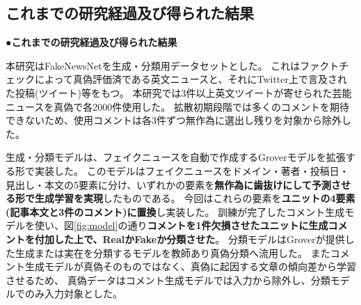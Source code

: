 {	%


	\subsection{これまでの研究経過及び得られた結果}
	\noindent
	●\textbf{これまでの研究経過及び得られた結果}

	本研究はFakeNewsNet\cite{Shu2018FakeNewsNetAD, shu2017fake}を生成・分類用データセットとした。
	これはファクトチェックによって真偽評価済である英文ニュースと、それにTwitter上で言及された投稿(ツイート)等をもつ。
	本研究では3件以上英文ツイートが寄せられた芸能ニュースを真偽で各2000件使用した。
	拡散初期段階では多くのコメントを期待できないため、使用コメントは各3件ずつ無作為に選出し残りを対象から除外した。

	生成・分類モデルは、フェイクニュースを自動で作成するGroverモデル\cite{NIPS2019_9106}を拡張する形で実装した。
	このモデルはフェイクニュースをドメイン・著者・投稿日・見出し・本文の5要素に分け、いずれかの要素を\textbf{無作為に歯抜けにして予測させる形で生成学習を実現}したものである。
	今回はこれらの要素を\textbf{ユニットの4要素(記事本文と3件のコメント)に置換}し実装した。
	訓練が完了したコメント生成モデルを使い、図\ref{fig:model}の通り\textbf{コメントを1件欠損させたユニットに生成コメントを付加した上で、RealかFakeか分類させた}。
	分類モデルはGroverが提供した生成または実在を分類するモデルを教師あり真偽分類へ流用した。
	またコメント生成モデルが真偽そのものではなく、真偽に起因する文章の傾向差から学習させるため、
	真偽データはコメント生成モデルでは入力から除外し、分類モデルでのみ入力対象とした。

}
